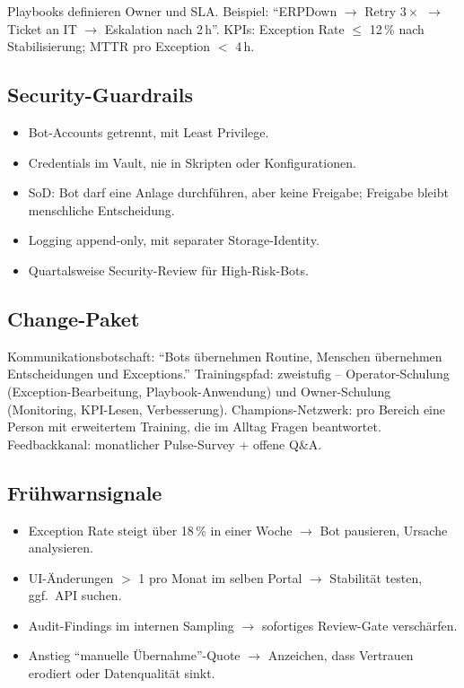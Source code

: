 \documentclass[11pt,a4paper,oneside]{article}
\begin{document}
Playbooks definieren Owner und SLA. Beispiel: ``ERPDown $\to$ Retry $3\times$ $\to$ Ticket an IT $\to$ Eskalation nach 2\,h''. KPIs: Exception Rate $\leq$ 12\,\% nach Stabilisierung; MTTR pro Exception $<$ 4\,h.

\subsection{Security-Guardrails}

\begin{itemize}
  \item Bot-Accounts getrennt, mit Least Privilege.
  \item Credentials im Vault, nie in Skripten oder Konfigurationen.
  \item SoD: Bot darf eine Anlage durchführen, aber keine Freigabe; Freigabe bleibt menschliche Entscheidung.
  \item Logging append-only, mit separater Storage-Identity.
  \item Quartalsweise Security-Review für High-Risk-Bots.
\end{itemize}

\subsection{Change-Paket}

Kommunikationsbotschaft: ``Bots übernehmen Routine, Menschen übernehmen Entscheidungen und Exceptions.'' Trainingspfad: zweistufig -- Operator-Schulung (Exception-Bearbeitung, Playbook-Anwendung) und Owner-Schulung (Monitoring, KPI-Lesen, Verbesserung). Champions-Netzwerk: pro Bereich eine Person mit erweitertem Training, die im Alltag Fragen beantwortet. Feedbackkanal: monatlicher Pulse-Survey + offene Q\&A.

\subsection{Frühwarnsignale}

\begin{itemize}
  \item Exception Rate steigt über 18\,\% in einer Woche $\to$ Bot pausieren, Ursache analysieren.
  \item UI-Änderungen $>$ 1 pro Monat im selben Portal $\to$ Stabilität testen, ggf.\ API suchen.
  \item Audit-Findings im internen Sampling $\to$ sofortiges Review-Gate verschärfen.
  \item Anstieg ``manuelle Übernahme''-Quote $\to$ Anzeichen, dass Vertrauen erodiert oder Datenqualität sinkt.
\end{itemize}
\end{document}
